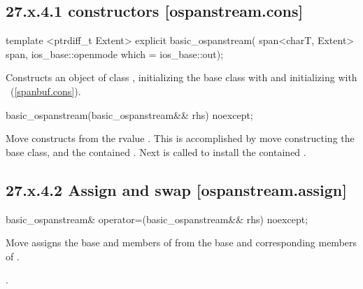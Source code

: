 \documentclass[ebook,11pt,article]{memoir}
\begin{document}
\subsection{27.x.4.1  constructors [ospanstream.cons]}
\label{ospanstream.cons}

\begin{itemdecl}
template <ptrdiff_t Extent>
explicit basic_ospanstream(
  span<charT, Extent> span,
  ios_base::openmode which = ios_base::out);
\end{itemdecl}

\begin{itemdescr}
\pnum
\effects
Constructs an object of class
,
initializing the base class with
and initializing  with
~(\ref{spanbuf.cons}).
\end{itemdescr}

\begin{itemdecl}
basic_ospanstream(basic_ospanstream&& rhs) noexcept;
\end{itemdecl}

\begin{itemdescr}
\pnum
\effects Move constructs from the rvalue . This
is accomplished by move constructing the base class, and the contained
.
Next  is called to
install the contained .
\end{itemdescr}

\subsection{27.x.4.2 Assign and swap [ospanstream.assign]}
\label{ospanstream.assign}

\begin{itemdecl}
basic_ospanstream& operator=(basic_ospanstream&& rhs) noexcept;
\end{itemdecl}

\begin{itemdescr}
\pnum
\effects Move assigns the base and members of  from the base and corresponding
members of .

\pnum
\returns {}.
\end{itemdescr}
\end{document}
